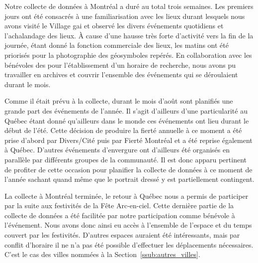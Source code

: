 Notre collecte de données à Montréal a duré au total trois semaines.
Les premiers jours ont été consacrés à une familiarisation avec les lieux durant lesquels nous avons visité le Village gai et observé les divers événements quotidiens et l'achalandage des lieux.
À cause d'une hausse très forte d'activité vers la fin de la journée, étant donné la fonction commerciale des lieux, les matins ont été priorisés pour la photographie des géosymboles repérés.
En collaboration avec les bénévoles des \agq{} pour l'établissement d'un horaire de recherche, nous avons pu travailler en archives et couvrir l'ensemble des événements \lgbt{} qui se déroulaient durant le mois.

Comme il était prévu à la collecte, durant le mois d'août sont planifiés une grande part des événements \lgbt{} de l'année.
Il s'agit d'ailleurs d'une particularité au Québec étant donné qu'ailleurs dans le monde ces événements ont lieu durant le début de l'été.
Cette décision de produire la fierté annuelle à ce moment a été prise d'abord par Divers/Cité puis par Fierté Montréal et a été reprise également à Québec.
D'autres événements d'envergure ont d'ailleurs été organisés en parallèle par différents groupes de la communauté.
Il est donc apparu pertinent de profiter de cette occasion pour planifier la collecte de données à ce moment de l'année sachant quand même que le portrait dressé y est partiellement contingent.

La collecte à Montréal terminée, le retour à Québec nous a permis de participer par la suite aux festivités de la Fête Arc-en-ciel.
Cette dernière partie de la collecte de données a été facilitée par notre participation comme bénévole à l'événement.
Nous avons donc ainsi eu accès à l'ensemble de l'espace et du temps couvert par les festivités.
D'autres espaces auraient été intéressants, mais par conflit d'horaire il ne n'a pas été possible d'effectuer les déplacements nécessaires.
C'est le cas des villes nommées à la Section~\ref{ssub:autres_villes}.


